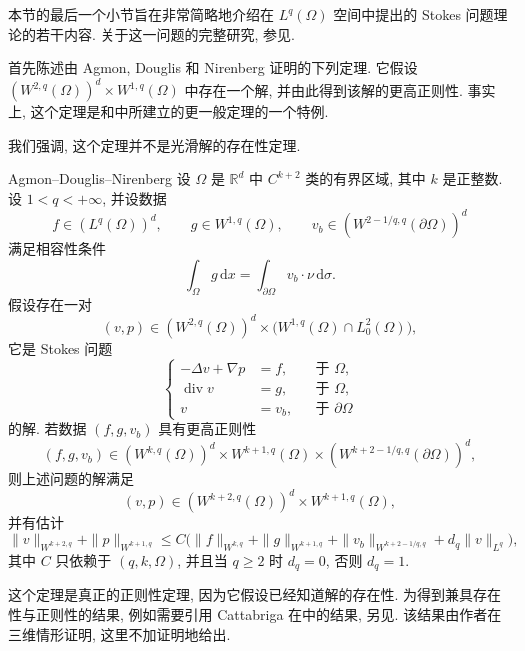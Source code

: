 本节的最后一个小节旨在非常简略地介绍在 $L^q(\Omega)$ 空间中提出的 Stokes 问题理论的若干内容. 关于这一问题的完整研究, 参见.

首先陈述由 Agmon, Douglis 和 Nirenberg 证明的下列定理. 它假设 $(W^{2,q}(\Omega))^d\times W^{1,q}(\Omega)$ 中存在一个解, 并由此得到该解的更高正则性. 事实上, 这个定理是和中所建立的更一般定理的一个特例.

我们强调, 这个定理并不是光滑解的存在性定理.

\begin{Theorem}{Agmon--Douglis--Nirenberg}
\label{thm:chap4-stokes-agmon-douglis-nirenberg}
设 $\Omega$ 是 $\mathbb R^d$ 中 $C^{k+2}$ 类的有界区域, 其中 $k$ 是正整数. 设 $1<q<+\infty$, 并设数据
\[
 f\in(L^q(\Omega))^d,\qquad g\in W^{1,q}(\Omega),\qquad
 v_b\in(W^{2-1/q,q}(\partial\Omega))^d
\]
满足相容性条件
\[
 \int_\Omega g\,\mathrm dx=\int_{\partial\Omega}v_b\cdot\nu\,\mathrm d\sigma.
\]
假设存在一对
\[
 (v,p)\in(W^{2,q}(\Omega))^d\times\bigl(W^{1,q}(\Omega)\cap L_0^2(\Omega)\bigr),
\]
它是 Stokes 问题
\[
 \left\{
 \begin{aligned}
  -\Delta v+\nabla p&=f,&&\text{于 }\Omega,\\
  \operatorname{div}v&=g,&&\text{于 }\Omega,\\
  v&=v_b,&&\text{于 }\partial\Omega
 \end{aligned}
 \right.
\]
的解. 若数据 $(f,g,v_b)$ 具有更高正则性
\[
 (f,g,v_b)\in(W^{k,q}(\Omega))^d\times W^{k+1,q}(\Omega)
 \times(W^{k+2-1/q,q}(\partial\Omega))^d,
\]
则上述问题的解满足
\begin{equation}
 (v,p)\in(W^{k+2,q}(\Omega))^d\times W^{k+1,q}(\Omega),
 \label{eq:chap4-stokes-lq-regularity}
\end{equation}
并有估计
\begin{equation}
 \|v\|_{W^{k+2,q}}+\|p\|_{W^{k+1,q}}
 \leq C\bigl(\|f\|_{W^{k,q}}+\|g\|_{W^{k+1,q}}
 +\|v_b\|_{W^{k+2-1/q,q}}+d_q\|v\|_{L^q}\bigr),
 \label{eq:chap4-stokes-lq-estimate}
\end{equation}
其中 $C$ 只依赖于 $(q,k,\Omega)$, 并且当 $q\geq2$ 时 $d_q=0$, 否则 $d_q=1$.
\end{Theorem}

这个定理是真正的正则性定理, 因为它假设已经知道解的存在性. 为得到兼具存在性与正则性的结果, 例如需要引用 Cattabriga 在中的结果, 另见. 该结果由作者在三维情形证明, 这里不加证明地给出.

